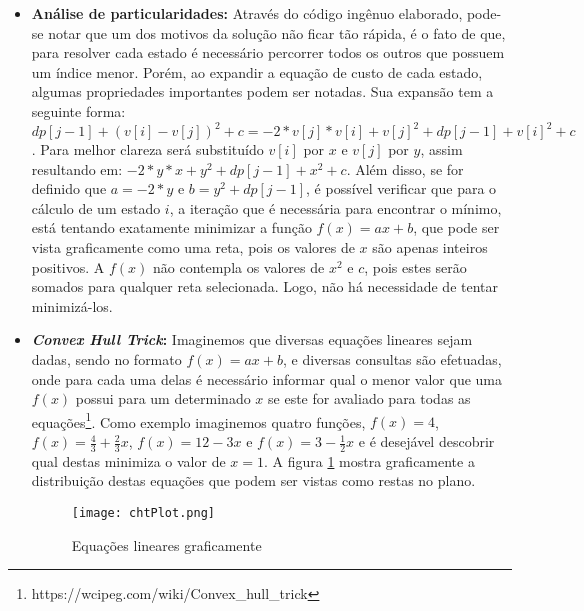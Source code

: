 \begin{itemize}[leftmargin=-.001in]
\item \textbf{Análise de particularidades:}
Através do código ingênuo elaborado, pode-se notar que um dos motivos da solução não ficar tão rápida, é o fato de que, para resolver cada estado é necessário percorrer todos os outros que possuem um índice menor. Porém, ao expandir a equação de custo de cada estado, algumas propriedades importantes podem ser notadas. Sua expansão tem a seguinte forma:
$dp[j-1] + (v[i] - v[j])^2 + c = -2*v[j]*v[i] + v[j]^2 + dp[j-1] + v[i]^2 + c$. Para melhor clareza será substituído $v[i]$ por $x$ e $v[j]$ por $y$, assim resultando em:
$-2*y*x + y^2 + dp[j-1] + x^2 + c$. Além disso, se for definido que $a = -2*y$ e $b = y^2 + dp[j-1]$, é possível verificar que para o cálculo de um estado $i$, a iteração que é necessária para encontrar o mínimo, está tentando exatamente minimizar a função $f(x) = ax + b$, que pode ser vista graficamente como uma reta, pois os valores de $x$ são apenas inteiros positivos. A $f(x)$ não contempla os valores de $x^2$ e $c$, pois estes serão somados para qualquer reta selecionada. Logo, não há necessidade de tentar minimizá-los.

\item \textbf{\textit{Convex Hull Trick}:}
Imaginemos que diversas equações lineares sejam dadas, sendo no formato $f(x) = ax + b$, e diversas consultas são efetuadas, onde para cada uma delas é necessário informar qual o menor valor que uma $f(x)$ possui para um determinado $x$ se este for avaliado para todas as equações\footnote{https://wcipeg.com/wiki/Convex\_hull\_trick}. 
Como exemplo imaginemos quatro funções, $f(x) = 4$, $f(x) = \frac{4}{3} + \frac{2}{3}x$, $f(x) = 12 - 3x$ e $f(x) = 3 - \frac{1}{2}x$ e é desejável descobrir qual destas minimiza o valor de $x = 1$. A figura \ref{fig:chtplot} mostra graficamente a distribuição destas equações que podem ser vistas como restas no plano.

\begin{figure}[H]
	\centering
	\caption[Equações lineares graficamente]{Equações lineares graficamente}
	\texttt{[image: chtPlot.png]} %
	\label{fig:chtplot}
\end{figure}


\end{itemize}
